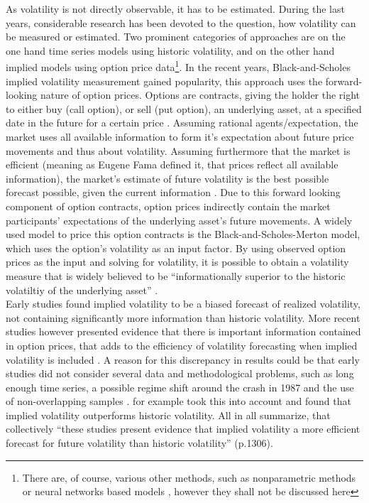 As volatility is not directly observable, it has to be estimated. During the last years, considerable research has been devoted to the question, how volatility can be measured or estimated. Two prominent categories of approaches are on the one hand time series models using historic volatility, and on the other hand implied models using option price data\footnote{There are, of course, various other methods, such as nonparametric methods or neural networks based models \parencite{jiang2003}, however they shall not be discussed here}. In the recent years, Black-and-Scholes implied volatility measurement gained popularity, this approach uses the forward-looking nature of option prices. Options are contracts, giving the holder the right to either buy (call option), or sell (put option), an underlying asset, at a specified date in the future for a certain price \parencite{hull2006}. Assuming rational agents/expectation, the market uses all available information to form it's expectation about future price movements and thus about volatility. Assuming furthermore that the market is efficient (meaning as Eugene Fama defined it, that prices reflect all available information), the market's estimate of future volatility is the best possible forecast possible, given the current information \parencite{christensen2002}. Due to this forward looking component of option contracts, option prices indirectly contain the market participants' expectations of the underlying asset's future movements. A widely used model to price this option contracts is the Black-and-Scholes-Merton model, which uses the option's volatility as an input factor. By using observed option prices as the input and solving for volatility, it is possible to obtain a volatility measure that is widely believed to be ``informationally superior to the historic volatiltiy of the underlying asset'' \parencite[p.1305]{jiang2003}.\\
Early studies found implied volatility to be a biased forecast of realized volatility, not containing significantly more information than historic volatility. More recent studies however presented evidence that there is important information contained in option prices, that adds to the efficiency of volatility forecasting when implied volatility is included \parencite{jiang2003}. A reason for this discrepancy in results could be that early studies did not consider several data and methodological problems, such as long enough time series, a possible regime shift around the crash in 1987 and the use of non-overlapping samples \parencite{jiang2003}. \citeauthor{christensen1998} for example took this into account and found that implied volatility outperforms historic volatility. All in all \citeauthor{jiang2003} summarize, that collectively ``these studies present evidence that implied volatility a more efficient forecast for future volatility than historic volatility'' (p.1306).

